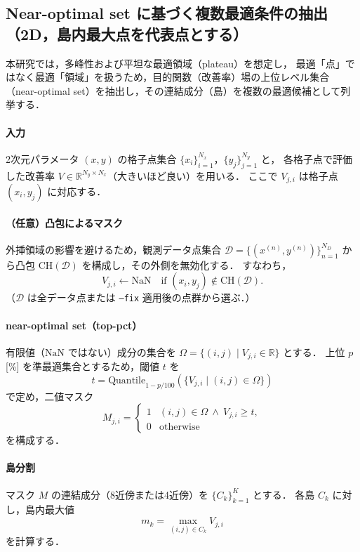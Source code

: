 \subsection{Near-optimal set に基づく複数最適条件の抽出（2D，島内最大点を代表点とする）}
本研究では，多峰性および平坦な最適領域（plateau）を想定し，
最適「点」ではなく最適「領域」を扱うため，目的関数（改善率）場の上位レベル集合
（near-optimal set）を抽出し，その連結成分（島）を複数の最適候補として列挙する．

\paragraph{入力}
2次元パラメータ $(x,y)$ の格子点集合
$\{x_i\}_{i=1}^{N_x}$，$\{y_j\}_{j=1}^{N_y}$ と，
各格子点で評価した改善率
$V \in \mathbb{R}^{N_y \times N_x}$（大きいほど良い）を用いる．
ここで $V_{j,i}$ は格子点 $(x_i,y_j)$ に対応する．

\paragraph{（任意）凸包によるマスク}
外挿領域の影響を避けるため，観測データ点集合 $\mathcal{D}=\{(x^{(n)},y^{(n)})\}_{n=1}^{N_D}$
から凸包 $\mathrm{CH}(\mathcal{D})$ を構成し，その外側を無効化する．
すなわち，
\[
V_{j,i} \leftarrow \mathrm{NaN}\quad \text{if } (x_i,y_j)\notin \mathrm{CH}(\mathcal{D}).
\]
（$\mathcal{D}$ は全データ点または \texttt{--fix} 適用後の点群から選ぶ．）

\paragraph{near-optimal set（top-pct）}
有限値（$\mathrm{NaN}$ ではない）成分の集合を
$\Omega=\{(i,j)\mid V_{j,i}\in\mathbb{R}\}$ とする．
上位 $p$[\%] を準最適集合とするため，閾値 $t$ を
\[
t=\mathrm{Quantile}_{1-p/100}\left(\{V_{j,i}\mid (i,j)\in\Omega\}\right)
\]
で定め，二値マスク
\[
M_{j,i}=
\begin{cases}
1 & (i,j)\in\Omega \ \wedge\ V_{j,i}\ge t,\\
0 & \text{otherwise}
\end{cases}
\]
を構成する．

\paragraph{島分割}
マスク $M$ の連結成分（8近傍または4近傍）を $\{C_k\}_{k=1}^{K}$ とする．
各島 $C_k$ に対し，島内最大値
\[
m_k=\max_{(i,j)\in C_k} V_{j,i}
\]
を計算する．

